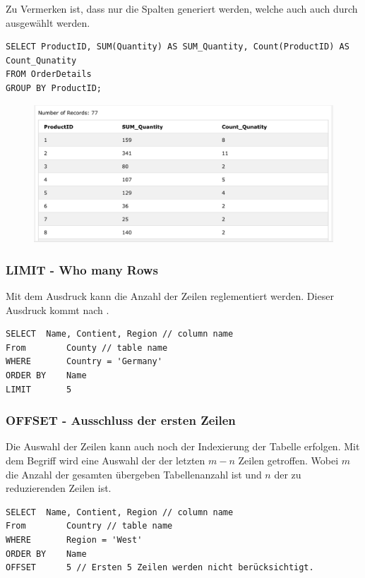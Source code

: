 Zu Vermerken ist, dass nur die Spalten generiert werden, welche auch auch durch  ausgewählt werden.

\begin{lstlisting}[style=SQL]
SELECT ProductID, SUM(Quantity) AS SUM_Quantity, Count(ProductID) AS Count_Qunatity
FROM OrderDetails
GROUP BY ProductID;
\end{lstlisting}

\begin{figure}[H]
	\centering
	\includegraphics[scale = 0.3]{attachment/chapter_3/Scc053}
	\caption{}
	\label{fig:Scc053}
\end{figure}

\subsubsection{LIMIT - Who many Rows}
Mit dem Ausdruck  kann die Anzahl der Zeilen reglementiert werden.
Dieser Ausdruck kommt nach .

\begin{lstlisting}[style=SQL]
SELECT 	Name, Contient, Region // column name
From 		County // table name
WHERE		Country = 'Germany'
ORDER BY	Name
LIMIT		5
\end{lstlisting}

\subsubsection{OFFSET - Ausschluss der ersten Zeilen}
Die Auswahl der Zeilen kann auch noch der Indexierung der Tabelle erfolgen.
Mit dem Begriff  wird eine Auswahl der der letzten $m-n$ Zeilen getroffen. Wobei $m$ die Anzahl der gesamten übergeben Tabellenanzahl ist und $n$ der zu reduzierenden Zeilen ist.


\begin{lstlisting}[style=SQL]
SELECT 	Name, Contient, Region // column name
From 		Country // table name
WHERE		Region = 'West'
ORDER BY	Name
OFFSET		5 // Ersten 5 Zeilen werden nicht berücksichtigt.
\end{lstlisting}

